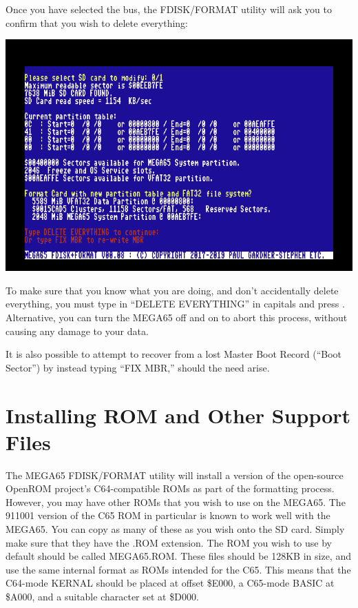 Once you have selected the bus, the FDISK/FORMAT utility will ask you
to confirm that you wish to delete everything:

\includegraphics[width=\linewidth]{images/ss-m65fdisk-typesomething.png}

To make sure that you
know what you are doing, and don't accidentally delete everything, you
must type in ``DELETE EVERYTHING'' in capitals and press
.  Alternative, you can turn the MEGA65 off and on to
abort this process, without causing any damage to your data.

It is also possible to attempt to recover from a lost Master Boot
Record (``Boot Sector'') by instead typing ``FIX MBR,'' should the
need arise.

\section{Installing ROM and Other Support Files}

The MEGA65 FDISK/FORMAT utility will install a version of the
open-source OpenROM project's C64-compatible ROMs as part of the
formatting process. However, you may have other ROMs that you wish to
use on the MEGA65. The 911001 version of the C65 ROM in
particular is known to work well with the MEGA65.
You can copy as many of these as you wish onto the
SD card.  Simply make sure that they have the .ROM extension.  The ROM
you wish to use by default should be called MEGA65.ROM.  These files
should be 128KB in size, and use the same internal format as ROMs
intended for the C65.  This means that the C64-mode KERNAL should be
placed at offset \$E000, a C65-mode BASIC at \$A000, and a suitable
character set at \$D000.  

